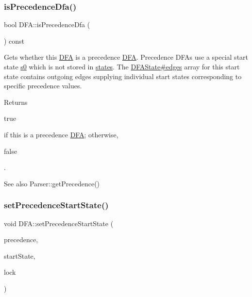 \subsubsection{\texorpdfstring{is\+Precedence\+Dfa()}{isPrecedenceDfa()}}
{\footnotesize\ttfamily bool D\+F\+A\+::is\+Precedence\+Dfa (\begin{DoxyParamCaption}{ }\end{DoxyParamCaption}) const}

Gets whether this \hyperlink{classantlr4_1_1dfa_1_1DFA}{D\+FA} is a precedence \hyperlink{classantlr4_1_1dfa_1_1DFA}{D\+FA}. Precedence D\+F\+As use a special start state \hyperlink{}{s0} which is not stored in \hyperlink{}{states}. The \hyperlink{}{D\+F\+A\+State\#edges} array for this start state contains outgoing edges supplying individual start states corresponding to specific precedence values.

\begin{DoxyReturn}{Returns}

\begin{DoxyCode}
\textcolor{keyword}{true} 
\end{DoxyCode}
 if this is a precedence \hyperlink{classantlr4_1_1dfa_1_1DFA}{D\+FA}; otherwise, 
\begin{DoxyCode}
\textcolor{keyword}{false} 
\end{DoxyCode}
 . 
\end{DoxyReturn}
\begin{DoxySeeAlso}{See also}
Parser\+::get\+Precedence() 
\end{DoxySeeAlso}
\mbox{\label{classantlr4_1_1dfa_1_1DFA_a0283251c54b224124da6fc0600717617}} 
\subsubsection{\texorpdfstring{set\+Precedence\+Start\+State()}{setPrecedenceStartState()}}
{\footnotesize\ttfamily void D\+F\+A\+::set\+Precedence\+Start\+State (\begin{DoxyParamCaption}\item[{int}]{precedence,  }\item[{D\+F\+A\+State $\ast$}]{start\+State,  }\item[{\hyperlink{classantlrcpp_1_1SingleWriteMultipleReadLock}{antlrcpp\+::\+Single\+Write\+Multiple\+Read\+Lock} \&}]{lock }\end{DoxyParamCaption})}


